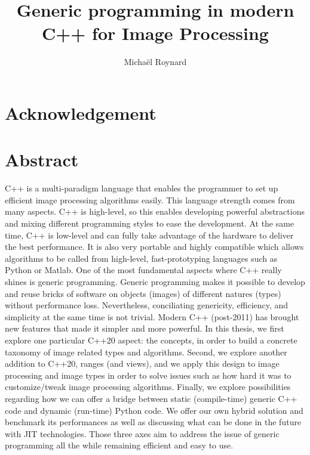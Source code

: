 \documentclass[11pt,a4paper]{book}
\begin{document}
%
\title{Generic programming in modern C++ for Image Processing}


\author{Michaël Roynard}



\maketitle

\section{Acknowledgement}
\label{sec:acknowledgement}


\section{Abstract}
\label{sec:abstract}
C++ is a multi-paradigm language that enables the programmer to set up efficient image processing algorithms easily.
This language strength comes from many aspects. C++ is high-level, so this enables developing powerful abstractions and
mixing different programming styles to ease the development. At the same time, C++ is low-level and can fully take
advantage of the hardware to deliver the best performance. It is also very portable and highly compatible which allows
algorithms to be called from high-level, fast-prototyping languages such as Python or Matlab. One of the most
fundamental aspects where C++ really shines is generic programming. Generic programming makes it possible to develop and
reuse bricks of software on objects (images) of different natures (types) without performance loss. Nevertheless,
conciliating genericity, efficiency, and simplicity at the same time is not trivial. Modern C++ (post-2011) has brought
new features that made it simpler and more powerful. In this thesis, we first explore one particular C++20 aspect: the
concepts, in order to build a concrete taxonomy of image related types and algorithms. Second, we explore another
addition to C++20, ranges (and views), and we apply this design to image processing and image types in order to solve
issues such as how hard it was to customize/tweak image processing algorithms. Finally, we explore possibilities
regarding how we can offer a bridge between static (compile-time) generic C++ code and dynamic (run-time) Python code.
We offer our own hybrid solution and benchmark its performances as well as discussing what can be done in the future
with JIT technologies. Those three axes aim to address the issue of generic programming all the while remaining
efficient and easy to use.
\end{document}
